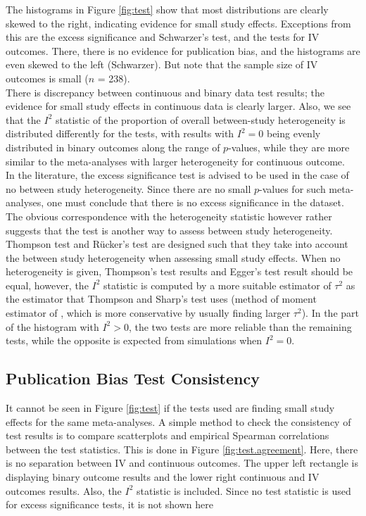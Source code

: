 \documentclass[11pt,a4paper,twoside]{book}\usepackage[]{graphicx}\usepackage[]{color}
\begin{document}
The histograms in Figure \ref{fig:test} show that most distributions are clearly skewed to the right, indicating evidence for small study effects. Exceptions from this are the excess significance and Schwarzer's test, and the tests for IV outcomes. There, there is no evidence for publication bias, and the histograms are even skewed to the left (Schwarzer). But note that the sample size of IV outcomes is small ($n$ = 238). \\
There is discrepancy between continuous and binary data test results; the evidence for small study effects in continuous data is clearly larger. Also, we see that the $I^2$ statistic of the proportion of overall between-study heterogeneity is distributed differently for the tests, with results with $I^2 = 0$ being evenly distributed in binary outcomes along the range of $p$-values, while they are more similar to the meta-analyses with larger heterogeneity for continuous outcome.\\
In the literature, the excess significance test is advised to be used in the case of no between study heterogeneity. Since there are no small $p$-values for such meta-analyses, one must conclude that there is no excess significance in the dataset. The obvious correspondence with the heterogeneity statistic however rather suggests that the test is another way to assess between study heterogeneity. Thompson test and R\"ucker's test are designed such that they take into account the between study heterogeneity when assessing small study effects. When no heterogeneity is given, Thompson's test results and Egger's test result should be equal, however, the $I^2$ statistic is computed by a more suitable estimator \citep{paulemandel} of $\tau^2$ as the estimator that Thompson and Sharp's test uses (method of moment estimator of \citet{tau.estimator}, which is more conservative by usually finding larger $\tau^2$). In the part of the histogram with $I^2 > 0$, the two tests are more reliable than the remaining tests, while the opposite is expected from simulations \citep{limitmeta} when $I^2 = 0$.\\


\subsection{Publication Bias Test Consistency}
It cannot be seen in Figure \ref{fig:test} if the tests used are finding small study effects for the same meta-analyses. A simple method to check the consistency of test results is to compare scatterplots and empirical Spearman correlations between the test statistics. This is done in Figure \ref{fig:test.agreement}. Here, there is no separation between IV and continuous outcomes. The upper left rectangle is displaying binary outcome results and the lower right continuous and IV outcomes results. Also, the $I^2$ statistic is included. Since no test statistic is used for excess significance tests, it is not shown here
\end{document}
